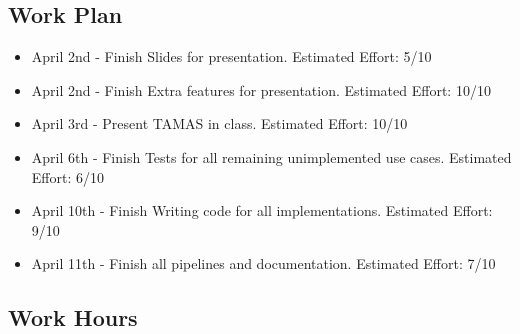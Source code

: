 \documentclass[12pt]{article}
\begin{document}
 \subsection{Work Plan}

\begin{itemize}
   \item April 2nd - Finish Slides for presentation. Estimated Effort: 5/10
   \item April 2nd - Finish Extra features for presentation. Estimated Effort: 10/10
   \item  April 3rd - Present TAMAS in class. Estimated Effort: 10/10 
   \item  April 6th - Finish Tests for all remaining unimplemented use cases. Estimated Effort: 6/10
   \item  April 10th - Finish Writing code for all implementations. Estimated Effort: 9/10
   \item April 11th - Finish all pipelines and documentation. Estimated Effort: 7/10
\end{itemize}

 \subsection{Work Hours}
\end{document}
